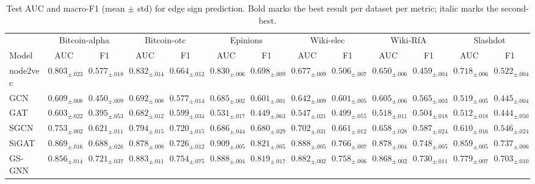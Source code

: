 \documentclass[sigconf, review, anonymous]{acmart}
\theoremstyle{plain}
\theoremstyle{definition}
\begin{document}
\begin{table}[t!]
\centering
\scriptsize
\caption{Test AUC and macro-F1 (mean $\pm$ std) for edge sign prediction. Bold marks the best result per dataset per metric; italic marks the second-best.}
\label{tab:result1}
\setlength{\tabcolsep}{3.6pt}
\renewcommand{\arraystretch}{0.92}
\begin{tabular}{l*{6}{cc}}
\toprule
& \multicolumn{2}{c}{Bitcoin-alpha} & \multicolumn{2}{c}{Bitcoin-otc} & \multicolumn{2}{c}{Epinions} & \multicolumn{2}{c}{Wiki-elec} & \multicolumn{2}{c}{Wiki-RfA} & \multicolumn{2}{c}{Slashdot} \\
\cmidrule(lr){2-3}\cmidrule(lr){4-5}\cmidrule(lr){6-7}\cmidrule(lr){8-9}\cmidrule(lr){10-11}\cmidrule(lr){12-13}
Model & AUC & F1 & AUC & F1 & AUC & F1 & AUC & F1 & AUC & F1 & AUC & F1 \\
\midrule
node2vec & $0.803_{\pm.023}$ & $0.577_{\pm.018}$ & $0.832_{\pm.014}$ & $0.664_{\pm.012}$ & $0.830_{\pm.006}$ & $0.698_{\pm.009}$ & $0.677_{\pm.009}$ & $0.506_{\pm.007}$ & $0.650_{\pm.006}$ & $0.459_{\pm.004}$ & $0.718_{\pm.006}$ & $0.522_{\pm.004}$ \\
\midrule
GCN & $0.609_{\pm.008}$ & $0.450_{\pm.009}$ & $0.692_{\pm.008}$ & $0.577_{\pm.014}$ & $0.685_{\pm.002}$ & $0.601_{\pm.001}$ & $0.642_{\pm.009}$ & $0.601_{\pm.005}$ & $0.605_{\pm.006}$ & $0.565_{\pm.003}$ & $0.519_{\pm.005}$ & $0.445_{\pm.004}$ \\
GAT & $0.603_{\pm.022}$ & $0.395_{\pm.053}$ & $0.682_{\pm.012}$ & $0.599_{\pm.034}$ & $0.531_{\pm.017}$ & $0.449_{\pm.063}$ & $0.547_{\pm.021}$ & $0.499_{\pm.055}$ & $0.518_{\pm.011}$ & $0.504_{\pm.018}$ & $0.512_{\pm.018}$ & $0.444_{\pm.050}$ \\
SGCN & $0.753_{\pm.002}$ & $0.621_{\pm.011}$ & $0.794_{\pm.015}$ & $0.720_{\pm.015}$ & $0.686_{\pm.044}$ & $0.680_{\pm.029}$ & $0.702_{\pm.031}$ & $0.661_{\pm.012}$ & $0.658_{\pm.028}$ & $0.587_{\pm.024}$ & $0.610_{\pm.016}$ & $0.546_{\pm.024}$ \\
SiGAT & $0.869_{\pm.016}$ & $0.688_{\pm.026}$ & $0.878_{\pm.008}$ & $0.726_{\pm.012}$ & $0.909_{\pm.005}$ & $0.821_{\pm.005}$ & $0.888_{\pm.005}$ & $0.766_{\pm.007}$ & $0.878_{\pm.004}$ & $0.748_{\pm.005}$ & $0.859_{\pm.005}$ & $0.737_{\pm.006}$ \\
GS-GNN & $0.856_{\pm.014}$ & $\mathit{0.721_{\pm.037}}$ & $0.883_{\pm.011}$ & $0.754_{\pm.075}$ & $0.888_{\pm.004}$ & $0.819_{\pm.017}$ & $0.882_{\pm.002}$ & $0.758_{\pm.006}$ & $0.868_{\pm.002}$ & $0.730_{\pm.011}$ & $0.779_{\pm.007}$ & $0.703_{\pm.010}$ \\

\end{tabular}
\end{table}
\end{document}
